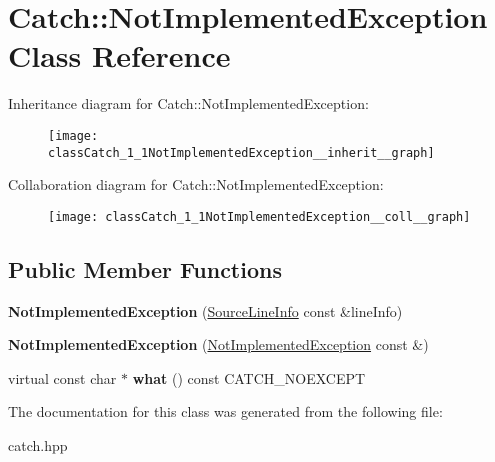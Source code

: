 \hypertarget{classCatch_1_1NotImplementedException}{}\section{Catch\+:\+:Not\+Implemented\+Exception Class Reference}
\label{classCatch_1_1NotImplementedException}


Inheritance diagram for Catch\+:\+:Not\+Implemented\+Exception\+:
\nopagebreak
\begin{figure}[H]
\begin{center}
\leavevmode
\texttt{[image: classCatch\_1\_1NotImplementedException\_\_inherit\_\_graph]}
\end{center}
\end{figure}


Collaboration diagram for Catch\+:\+:Not\+Implemented\+Exception\+:
\nopagebreak
\begin{figure}[H]
\begin{center}
\leavevmode
\texttt{[image: classCatch\_1\_1NotImplementedException\_\_coll\_\_graph]}
\end{center}
\end{figure}
\subsection*{Public Member Functions}
\begin{DoxyCompactItemize}
\item 
\mbox{\label{classCatch_1_1NotImplementedException_ab4f0a5c39d8ffb72c664e2c07e180634}} 
{\bfseries Not\+Implemented\+Exception} (\hyperlink{structCatch_1_1SourceLineInfo}{Source\+Line\+Info} const \&line\+Info)
\item 
\mbox{\label{classCatch_1_1NotImplementedException_a508a7a833455da2d3c10ea1a9d45e982}} 
{\bfseries Not\+Implemented\+Exception} (\hyperlink{classCatch_1_1NotImplementedException}{Not\+Implemented\+Exception} const \&)
\item 
\mbox{\label{classCatch_1_1NotImplementedException_ad4c13963f1a8feacda0cd331adda89e3}} 
virtual const char $\ast$ {\bfseries what} () const C\+A\+T\+C\+H\+\_\+\+N\+O\+E\+X\+C\+E\+PT
\end{DoxyCompactItemize}


The documentation for this class was generated from the following file\+:\begin{DoxyCompactItemize}
\item 
catch.\+hpp\end{DoxyCompactItemize}

